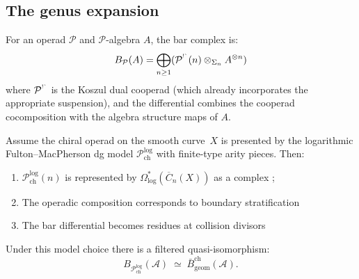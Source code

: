 \subsection{The genus expansion}
\label{sec:genus_expansion_panorama}

\begin{theorem}\label{thm:operadic-bar}
For an operad $\mathcal{P}$ and $\mathcal{P}$-algebra $A$, the bar complex is:
\[B_{\mathcal{P}}(A) = \bigoplus_{n \geq 1} (\mathcal{P}^{\text{\raisebox{0.5ex}{\tiny !\textasciigrave}}}(n) \otimes_{\Sigma_n} A^{\otimes n})\]
where $\mathcal{P}^{\text{\raisebox{0.5ex}{\tiny !\textasciigrave}}}$ is the Koszul dual cooperad (which already incorporates the appropriate suspension), and the differential combines the cooperad cocomposition with the algebra structure maps of $A$.
\end{theorem}

\begin{theorem}\label{thm:geometric-bridge}
Assume the chiral operad on the smooth curve~$X$ is presented by
the logarithmic Fulton--MacPherson dg model
$\mathcal{P}_{\mathrm{ch}}^{\log}$ with finite-type arity pieces.
Then:
\begin{enumerate}
\item $\mathcal{P}_{\mathrm{ch}}^{\log}(n)$ is represented by
 $\Omega^*_{\log}(\overline{C}_n(X))$ as a complex
 \cite{KontsevichSoibelman};
\item The operadic composition corresponds to boundary stratification
\item The bar differential becomes residues at collision divisors
\end{enumerate}

Under this model choice there is a filtered quasi-isomorphism:
\[
B_{\mathcal{P}_{\mathrm{ch}}^{\log}}(\mathcal{A})
\;\simeq\;
\bar{B}^{\text{ch}}_{\text{geom}}(\mathcal{A}).
\]
\end{theorem}

